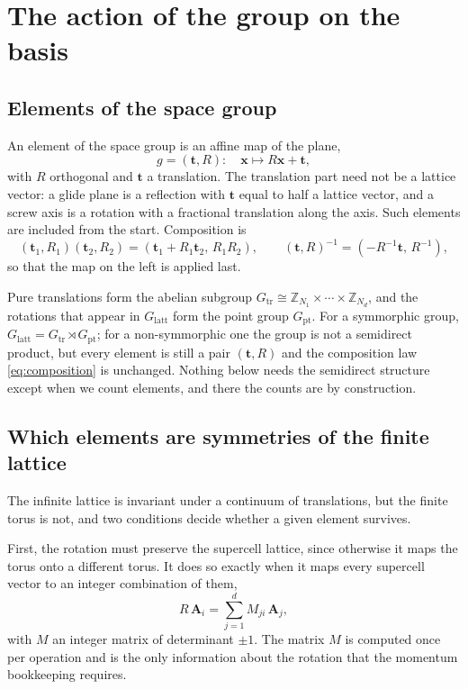 \documentclass[12pt]{article}
\newcommand{\Glatt}{G_{\mathrm{latt}}}
\newcommand{\Gtr}{G_{\mathrm{tr}}}
\newcommand{\Gpt}{G_{\mathrm{pt}}}
\begin{document}
\section{The action of the group on the basis}\label{sec:actions}

\subsection{Elements of the space group}

An element of the space group is an affine map of the plane,
\begin{equation}
  g = (\mathbf{t}, R): \quad \mathbf{x}\mapsto R\mathbf{x} + \mathbf{t},
  \label{eq:affine}
\end{equation}
with $R$ orthogonal and $\mathbf{t}$ a translation. The translation part need not
be a lattice vector: a glide plane is a reflection with
$\mathbf{t}$ equal to half a lattice vector, and a screw axis is a rotation with
a fractional translation along the axis. Such elements are included from the
start. Composition is
\begin{equation}
  (\mathbf{t}_1,R_1)(\mathbf{t}_2,R_2) = (\mathbf{t}_1 + R_1\mathbf{t}_2,\,
  R_1R_2),
  \qquad
  (\mathbf{t},R)^{-1} = (-R^{-1}\mathbf{t},\,R^{-1}),
  \label{eq:composition}
\end{equation}
so that the map on the left is applied last.

Pure translations form the abelian subgroup $G_{\mathrm{tr}} \cong \mathbb{Z}_{N_1}
\times\cdots\times \mathbb{Z}_{N_d}$, and the rotations that appear in
$G_{\mathrm{latt}}$ form the point group $\Gpt$. For a symmorphic group,
$\Glatt = \Gtr \rtimes \Gpt$; for a non-symmorphic one the group is not a semidirect
product, but every element is still a pair $(\mathbf{t},R)$ and the composition
law \eqref{eq:composition} is unchanged. Nothing below needs the semidirect
structure except when we count elements, and there the counts are by
construction.

\subsection{Which elements are symmetries of the finite lattice}

The infinite lattice is invariant under a continuum of translations, but the
finite torus is not, and two conditions decide whether a given element survives.

First, the rotation must preserve the supercell lattice, since otherwise it maps
the torus onto a different torus. It does so exactly when it maps every supercell
vector to an integer combination of them,
\begin{equation}
  R\,\mathbf{A}_i = \sum_{j=1}^{d} M_{ji}\,\mathbf{A}_j,
  \label{eq:intmat}
\end{equation}
with $M$ an integer matrix of determinant $\pm 1$. The matrix $M$ is computed once
per operation and is the only information about the rotation that the momentum
bookkeeping requires.
\end{document}
